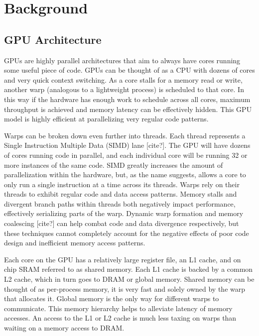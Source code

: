 \chapter{Background}

\section{GPU Architecture}
GPUs are highly parallel architectures that aim to always have cores running some useful piece of code. GPUs can be thought of as a CPU with dozens of cores and very quick context switching. As a core stalls for a memory read or write, another warp (analogous to a lightweight process) is scheduled to that core. In this way if the hardware has enough work to schedule across all cores, maximum throughput is achieved and memory latency can be effectively hidden. This GPU model is highly efficient at parallelizing very regular code patterns.

Warps can be broken down even further into threads. Each thread represents a Single Instruction Multiple Data (SIMD) lane [cite?]. The GPU will have dozens of cores running code in parallel, and each individual core will be running 32 or more instances of the same code. SIMD greatly increases the amount of parallelization within the hardware, but, as the name suggests, allows a core to only run a single instruction at a time across its threads. Warps rely on their threads to exhibit regular code and data access patterns. Memory stalls and divergent branch paths within threads both negatively impact performance, effectively serializing parts of the warp. Dynamic warp formation \cite{dynamicwarp1,dynamicwarp2} and memory coalescing [cite?] can help combat code and data divergence respectively, but these techniques cannot completely account for the negative effects of poor code design and inefficient memory access patterns.

Each core on the GPU has a relatively large register file, an L1 cache, and on chip SRAM referred to as shared memory. Each L1 cache is backed by a common L2 cache, which in turn goes to DRAM or global memory. Shared memory can be thought of as per-process memory, it is very fast and solely owned by the warp that allocates it. Global memory is the only way for different warps to communicate. This memory hierarchy helps to alleviate latency of memory accesses. An access to the L1 or L2 cache is much less taxing on warps than waiting on a memory access to DRAM.


